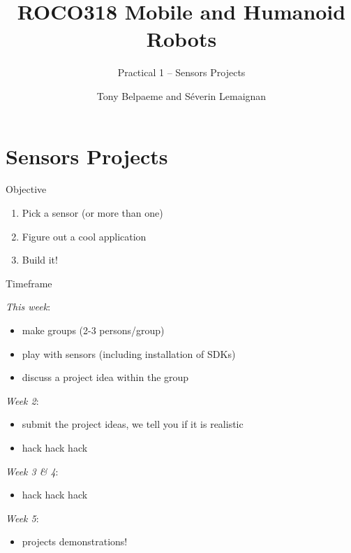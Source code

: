\documentclass[compress]{beamer}
\title{ROCO318 \newline Mobile and Humanoid Robots}
\subtitle{Practical 1 -- Sensors Projects}
\date{}
\author{Tony Belpaeme and Séverin Lemaignan}
\institute{Centre for Neural Systems and Robotics\\{\bf Plymouth University}}
\providecommand{\tightlist}{%
  \setlength{\itemsep}{0pt}\setlength{\parskip}{0pt}}
\begin{document}

\maketitle

\section{Sensors Projects}\label{sensors-projects}

\begin{frame}{Objective}

\begin{enumerate}
\def\labelenumi{\arabic{enumi}.}
\tightlist
\item
  Pick a sensor (or more than one)
\item
  Figure out a cool application
\item
  Build it!
\end{enumerate}

\end{frame}


\begin{frame}{Timeframe}

\emph{This week}:

\begin{itemize}
\tightlist
\item
  make groups (2-3 persons/group)
\item
  play with sensors (including installation of SDKs)
\item
  discuss a project idea within the group
\end{itemize}

\emph{Week 2}:

\begin{itemize}
\tightlist
\item
  submit the project ideas, we tell you if it is realistic
\item
  hack hack hack
\end{itemize}

\emph{Week 3 \& 4}:

\begin{itemize}
\tightlist
\item
  hack hack hack
\end{itemize}

\emph{Week 5}:

\begin{itemize}
\tightlist
\item
  projects demonstrations!
\end{itemize}

\end{frame}
\end{document}
